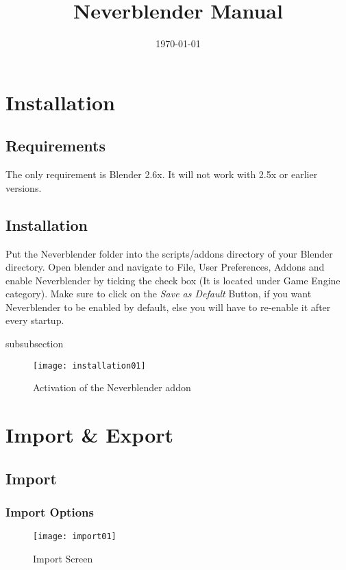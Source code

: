 \documentclass[a4paper]{article}
\begin{document}
\title{Neverblender Manual}

\date{\today}

\maketitle
\tableofcontents

\section{Installation}

\subsection{Requirements}
The only requirement is Blender 2.6x. It will not work with 2.5x or earlier versions.

\subsection{Installation}
Put the Neverblender folder into the scripts/addons directory of your Blender directory. Open blender and navigate to File, User Preferences, Addons and enable Neverblender by ticking the check box (It is located under Game Engine category). Make sure to click on the {\itshape{Save as Default}} Button, if you want Neverblender to be enabled by default, else you will have to re-enable it after every startup.


subsubsection{}

\begin{figure}
  \centering
  \texttt{[image: installation01]}
  \caption[Installation]{Activation of the Neverblender addon}
  \label{fig:Installation01}
\end{figure}

\section{Import \& Export}

\subsection{Import}

\subsubsection*{Import Options}

\begin{figure}
  \centering
  \texttt{[image: import01]}
  \caption[mdl import]{Import Screen}
  \label{fig:import01}
\end{figure}
\end{document}
